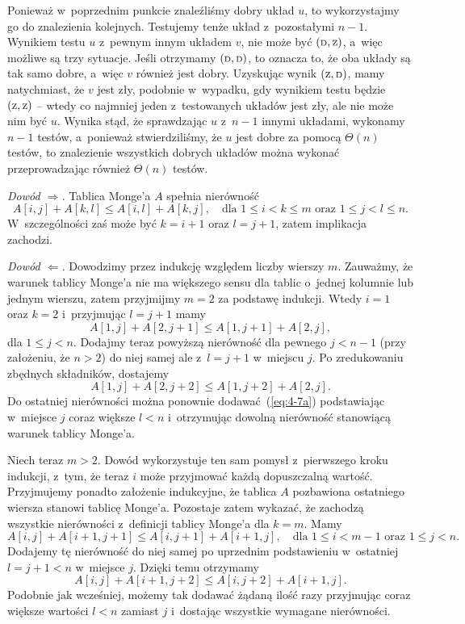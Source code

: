 Ponieważ w~poprzednim punkcie znaleźliśmy dobry układ $u$, to wykorzystajmy go do znalezienia kolejnych. Testujemy tenże układ z~pozostałymi $n-1$. Wynikiem testu $u$ z~pewnym innym układem $v$, nie może być $({\scriptstyle\rm D},{\scriptstyle\rm Z})$, a~więc możliwe są trzy sytuacje. Jeśli otrzymamy $({\scriptstyle\rm D},{\scriptstyle\rm D})$, to oznacza to, że oba układy są tak samo dobre, a~więc $v$ również jest dobry. Uzyskując wynik $({\scriptstyle\rm Z},{\scriptstyle\rm D})$, mamy natychmiast, że $v$ jest zły, podobnie w~wypadku, gdy wynikiem testu będzie $({\scriptstyle\rm Z},{\scriptstyle\rm Z})$ -- wtedy co najmniej jeden z~testowanych układów jest zły, ale nie może nim być $u$. Wynika stąd, że sprawdzając $u$ z~$n-1$ innymi układami, wykonamy $n-1$ testów, a~ponieważ stwierdziliśmy, że $u$ jest dobre za pomocą $\Theta(n)$ testów, to znalezienie wszystkich dobrych układów można wykonać przeprowadzając również $\Theta(n)$ testów.


\subproblem %
\noindent\emph{Dowód $\Rightarrow$.} Tablica Monge'a $A$ spełnia nierówność
\[
	A[i,j]+A[k,l] \le A[i,l]+A[k,j], \quad\text{dla $1\le i<k\le m$ oraz $1\le j<l\le n$}.
\]
W~szczególności zaś może być $k=i+1$ oraz $l=j+1$, zatem implikacja zachodzi.
\bigskip

\noindent\emph{Dowód $\Leftarrow$.} Dowodzimy przez indukcję względem liczby wierszy $m$. Zauważmy, że warunek tablicy Monge'a nie ma większego sensu dla tablic o~jednej kolumnie lub jednym wierszu, zatem przyjmijmy $m=2$ za podstawę indukcji. Wtedy $i=1$ oraz $k=2$ i~przyjmując $l=j+1$ mamy
\[
	A[1,j]+A[2,j+1] \le A[1,j+1]+A[2,j], \tag{$*$}\label{eq:4-7a}
\]
dla $1\le j<n$. Dodajmy teraz powyższą nierówność dla pewnego $j<n-1$ (przy założeniu, że $n>2$) do niej samej ale z~$l=j+1$ w~miejscu $j$. Po zredukowaniu zbędnych składników, dostajemy
\[
	A[1,j]+A[2,j+2] \le A[1,j+2]+A[2,j].
\]
Do ostatniej nierówności można ponownie dodawać~(\ref{eq:4-7a}) podstawiając w~miejsce $j$ coraz większe $l<n$ i~otrzymując dowolną nierówność stanowiącą warunek tablicy Monge'a.

Niech teraz $m>2$. Dowód wykorzystuje ten sam pomysł z~pierwszego kroku indukcji, z~tym, że teraz $i$ może przyjmować każdą dopuszczalną wartość. Przyjmujemy ponadto założenie indukcyjne, że tablica $A$ pozbawiona ostatniego wiersza stanowi tablicę Monge'a. Pozostaje zatem wykazać, że zachodzą wszystkie nierówności z~definicji tablicy Monge'a dla $k=m$. Mamy
\[
	A[i,j]+A[i+1,j+1] \le A[i,j+1]+A[i+1,j], \quad\text{dla $1\le i<m-1$ oraz $1\le j<n$}.
\]
Dodajemy tę nierówność do niej samej po uprzednim podstawieniu w~ostatniej $l=j+1<n$ w~miejsce $j$. Dzięki temu otrzymamy
\[
	A[i,j]+A[i+1,j+2] \le A[i,j+2]+A[i+1,j].
\]
Podobnie jak wcześniej, możemy tak dodawać żądaną ilość razy przyjmując coraz większe wartości $l<n$ zamiast $j$ i~dostając wszystkie wymagane nierówności.

